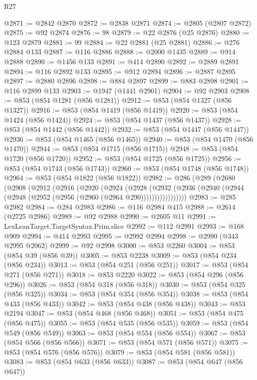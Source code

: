 \begin{lexlean}{R27}
\begin{coremodule}
@2871 := @2842 @2870
@2872 := @2838 @2871
@2874 := @2805 (@2807 @2872)
@2875 := @92 @2874
@2876 := 98
@2879 := @22 @2876 (@25 @2876)
@2880 := @123 @2879
@2881 := 99
@2884 := @22 @2881 (@25 @2881)
@2886 := @276 @2884 @133
@2887 := @116 @2886
@2888 := @2000 @1435
@2889 := @914 @2888
@2890 := @1456 @133
@2891 := @414 @2890
@2892 := @2889 @2891
@2894 := @116 @2892 @133
@2895 := @912 @2894
@2896 := @2887 @2895
@2897 := @2880 @2896
@2898 := @884 @2897
@2899 := @883 @2898
@2901 := @116 @2899 @133
@2903 := @1947 (@1441 @2901)
@2904 := @92 @2903
@2908 := @853 (@854 @1281 (@856 @1281))
@2912 := @853 (@854 @1327 (@856 @1327))
@2916 := @853 (@854 @1419 (@856 @1419))
@2920 := @853 (@854 @1424 (@856 @1424))
@2924 := @853 (@854 @1437 (@856 @1437))
@2928 := @853 (@854 @1442 (@856 @1442))
@2932 := @853 (@854 @1447 (@856 @1447))
@2936 := @853 (@854 @1465 (@856 @1465))
@2940 := @853 (@854 @1470 (@856 @1470))
@2944 := @853 (@854 @1715 (@856 @1715))
@2948 := @853 (@854 @1720 (@856 @1720))
@2952 := @853 (@854 @1725 (@856 @1725))
@2956 := @853 (@854 @1743 (@856 @1743))
@2960 := @853 (@854 @1748 (@856 @1748))
@2964 := @853 (@854 @1822 (@856 @1822))
@2982 := @286
    (@289
      (@2680
        (@2908
          (@2912
            (@2916
              (@2920
                (@2924
                  (@2928
                    (@2932
                      (@2936 (@2940 (@2944 (@2948 (@2952 (@2956 (@2960 (@2964 @290)))))))))))))))))
@2983 := @285 @2982
@2984 := @284 @2983
@2986 := @116 @2984 @415
@2988 := @2614 (@2725 @2986)
@2989 := @92 @2988
@2990 := @2605 @11
@2991 := LexLeanTarget.TargetSyntax.Prim.slice
@2992 := @112 @2991
@2993 := @168 @909
@2994 := @414 @2993
@2995 := @2992 @2994
@2998 := @2990 (@343 @2995 @2062)
@2999 := @92 @2998
@3000 := @853 @2260
@3004 := @853 (@854 @39 (@856 @39))
@3005 := @853 @2238
@3009 := @853 (@854 @234 (@856 @234))
@3013 := @853 (@854 @251 (@856 @251))
@3017 := @853 (@854 @271 (@856 @271))
@3018 := @853 @2220
@3022 := @853 (@854 @296 (@856 @296))
@3026 := @853 (@854 @318 (@856 @318))
@3030 := @853 (@854 @325 (@856 @325))
@3034 := @853 (@854 @354 (@856 @354))
@3038 := @853 (@854 @433 (@856 @433))
@3042 := @853 (@854 @438 (@856 @438))
@3043 := @853 @2194
@3047 := @853 (@854 @468 (@856 @468))
@3051 := @853 (@854 @475 (@856 @475))
@3055 := @853 (@854 @535 (@856 @535))
@3059 := @853 (@854 @549 (@856 @549))
@3063 := @853 (@854 @554 (@856 @554))
@3067 := @853 (@854 @566 (@856 @566))
@3071 := @853 (@854 @571 (@856 @571))
@3075 := @853 (@854 @576 (@856 @576))
@3079 := @853 (@854 @581 (@856 @581))
@3083 := @853 (@854 @633 (@856 @633))
@3087 := @853 (@854 @647 (@856 @647))

\end{coremodule}
\end{lexlean}
